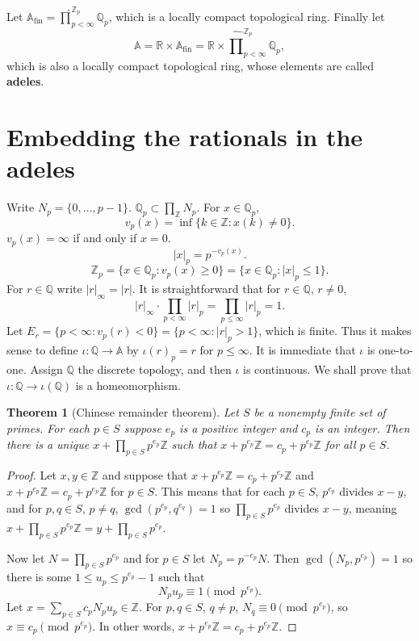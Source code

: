 \documentclass{article}
\newtheorem{theorem}{Theorem}
\theoremstyle{definition}
\begin{document}
Let $\mathbb{A}_{\textrm{fin}} = \widehat{\prod}_{p<\infty}^{\mathbb{Z}_p} \mathbb{Q}_p$, which is a locally
compact topological ring. Finally let 
\[
\mathbb{A} = \mathbb{R} \times \mathbb{A}_{\textrm{fin}}
=\mathbb{R} \times  \widehat{\prod}_{p<\infty}^{\mathbb{Z}_p} \mathbb{Q}_p,
\]
which is also a locally compact topological ring, whose elements are called \textbf{adeles}.






\section{Embedding the rationals in the adeles}
Write $N_p=\{0,\ldots,p-1\}$. $\mathbb{Q}_p \subset \prod_{\mathbb{Z}} N_p$. For 
$x \in \mathbb{Q}_p$,
\[
v_p(x) = \inf\{k \in \mathbb{Z}: x(k) \neq 0\}.
\]
$v_p(x) = \infty$ if and only if $x=0$.
\[
|x|_p = p^{-v_p(x)}.
\]
\[
\mathbb{Z}_p = \{x \in \mathbb{Q}_p: v_p(x) \geq 0\} = \{x \in \mathbb{Q}_p: |x|_p \leq 1\}.
\]
For $r \in \mathbb{Q}$ write $|r|_\infty = |r|$. 
It is straightforward that for $r \in \mathbb{Q}$, $r \neq 0$,
\[
|r|_\infty \cdot \prod_{p < \infty} |r|_p = \prod_{p \leq \infty} |r|_p = 1.
\]
Let $E_r=\{p<\infty: v_p(r)<0\}=\{p<\infty: |r|_p > 1\}$, which is finite.
Thus it makes sense to define
$\iota:\mathbb{Q} \to \mathbb{A}$ by 
$\iota(r)_p = r$ for $p \leq \infty$. It is immediate that $\iota$ is one-to-one.
Assign $\mathbb{Q}$ the discrete topology, and then $\iota$ is continuous. 
We shall prove that $\iota:\mathbb{Q} \to \iota(\mathbb{Q})$ is a homeomorphism.

\begin{theorem}[Chinese remainder theorem]
Let $S$ be a nonempty finite set of primes. For each $p \in S$ suppose $e_p$ is a positive integer and 
$c_p$ is an integer. Then there is a unique $x+\prod_{p \in S} p^{e_p} \mathbb{Z}$ such that
$x + p^{e_p} \mathbb{Z} = c_p + p^{e_p} \mathbb{Z}$ for all $p \in S$. 
\end{theorem}
\begin{proof}
Let $x,y \in \mathbb{Z}$ and 
suppose that $x+p^{e_p}\mathbb{Z}=c_p+p^{e_p}\mathbb{Z}$ and
$x+p^{e_p}\mathbb{Z}=c_p+p^{e_p}\mathbb{Z}$ for $p \in S$. 
This means that for each $p \in S$, $p^{e_p}$ divides $x-y$, and for
$p,q \in S$, $p \neq q$, $\gcd(p^{e_p},q^{e_q})=1$ so
$\prod_{p \in S} p^{e_p}$ divides $x-y$, meaning $x + \prod_{p \in S} p^{e_p} \mathbb{Z} = y + \prod_{p \in S} p^{e_p}$. 

Now let $N = \prod_{p \in S} p^{e_p}$ and for $p \in S$ let $N_p = p^{-e_p} N$.  
Then $\gcd(N_p,p^{e_p})=1$ so there is some $1 \leq u_p \leq p^{e_p}-1$ such that
\[
N_p u_p \equiv 1 \pmod{p^{e_p}}.
\]
Let $x = \sum_{p \in S} c_p N_p u_p \in \mathbb{Z}$. For $p,q \in S$, $q \neq p$,
$N_q \equiv 0 \pmod{p^{e_p}}$, so 
$x \equiv c_p \pmod{p^{e_p}}$. In other words, $x+ p^{e_p} \mathbb{Z} = c_p + p^{e_p}\mathbb{Z}$.
\end{proof}
\end{document}
